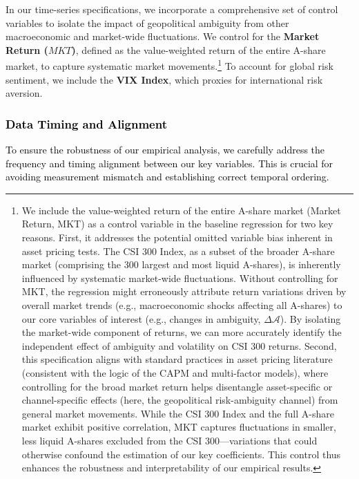 \documentclass[preprint,12pt,authoryear]{elsarticle}
\begin{document}
In our time-series specifications, we incorporate a comprehensive set of control variables to isolate the impact of geopolitical ambiguity from other macroeconomic and market-wide fluctuations. We control for the \textbf{Market Return ($MKT$)}, defined as the value-weighted return of the entire A-share market, to capture systematic market movements.\footnote{We include the value-weighted return of the entire A-share market (Market Return, MKT) as a control variable in the baseline regression for two key reasons. First, it addresses the potential omitted variable bias inherent in asset pricing tests. The CSI 300 Index, as a subset of the broader A-share market (comprising the 300 largest and most liquid A-shares), is inherently influenced by systematic market-wide fluctuations. Without controlling for MKT, the regression might erroneously attribute return variations driven by overall market trends (e.g., macroeconomic shocks affecting all A-shares) to our core variables of interest (e.g., changes in ambiguity, $\Delta\mathcal{A}$). By isolating the market-wide component of returns, we can more accurately identify the independent effect of ambiguity and volatility on CSI 300 returns. Second, this specification aligns with standard practices in asset pricing literature (consistent with the logic of the CAPM and multi-factor models), where controlling for the broad market return helps disentangle asset-specific or channel-specific effects (here, the geopolitical risk-ambiguity channel) from general market movements. While the CSI 300 Index and the full A-share market exhibit positive correlation, MKT captures fluctuations in smaller, less liquid A-shares excluded from the CSI 300—variations that could otherwise confound the estimation of our key coefficients. This control thus enhances the robustness and interpretability of our empirical results.} To account for global risk sentiment, we include the \textbf{VIX Index}, which proxies for international risk aversion.

\subsubsection{\textcolor{black}{Data Timing and Alignment}}
\textcolor{black}{To ensure the robustness of our empirical analysis, we carefully address the frequency and timing alignment between our key variables. This is crucial for avoiding measurement mismatch and establishing correct temporal ordering.}
\end{document}

